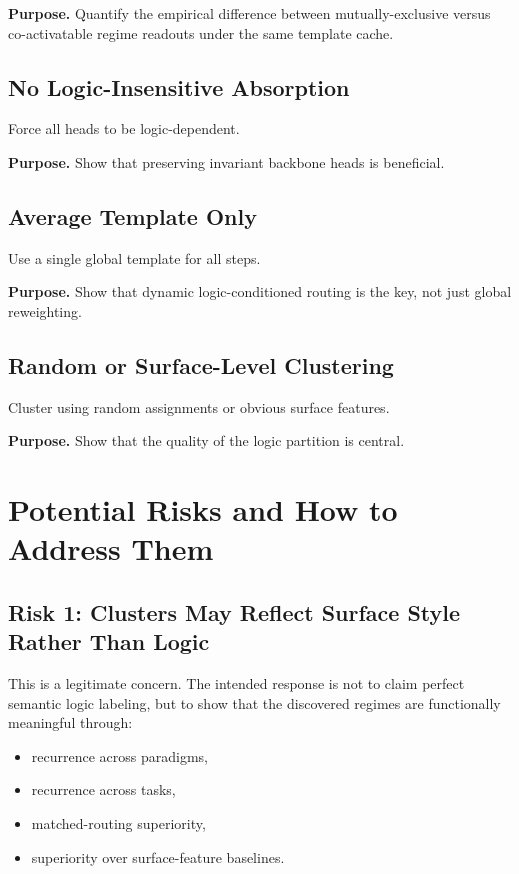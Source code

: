 \documentclass[11pt]{article}
\begin{document}
\textbf{Purpose.} Quantify the empirical difference between mutually-exclusive versus co-activatable regime readouts under the same template cache.

\subsection{No Logic-Insensitive Absorption}

Force all heads to be logic-dependent.

\textbf{Purpose.} Show that preserving invariant backbone heads is beneficial.

\subsection{Average Template Only}

Use a single global template for all steps.

\textbf{Purpose.} Show that dynamic logic-conditioned routing is the key, not just global reweighting.

\subsection{Random or Surface-Level Clustering}

Cluster using random assignments or obvious surface features.

\textbf{Purpose.} Show that the quality of the logic partition is central.

\section{Potential Risks and How to Address Them}

\subsection{Risk 1: Clusters May Reflect Surface Style Rather Than Logic}

This is a legitimate concern. The intended response is not to claim perfect semantic logic labeling, but to show that the discovered regimes are functionally meaningful through:
\begin{itemize}[leftmargin=1.5em]
    \item recurrence across paradigms,
    \item recurrence across tasks,
    \item matched-routing superiority,
    \item superiority over surface-feature baselines.
\end{itemize}
\end{document}
